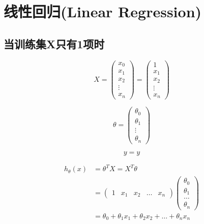 \section{线性回归(Linear Regression)}
\subsection{当训练集X只有1项时}

\begin{equation}
	X = \left(\begin{matrix}
			x_0 \\ x_1 \\ x_2 \\ \vdots \\ x_n
		\end{matrix}\right)
	= \left(\begin{matrix}
			1 \\ x_1 \\ x_2 \\ \vdots \\ x_n
		\end{matrix}\right)
\end{equation}


\begin{equation}
	\theta = \left(\begin{matrix}
			\theta_0 \\ \theta_1 \\ \vdots \\ \theta_n
		\end{matrix}\right)
\end{equation}


\begin{equation}
y = y
\end{equation}


\begin{equation} \begin{aligned}
	h_\theta(x) & = \theta^{T}X = X^T\theta \\
	& = \left( \begin{matrix}
			1 & x_1 & x_2 & \dots & x_n
		\end{matrix}\right)
		\left(\begin{matrix}
			\theta_0 \\
			\theta_1 \\
			\dots \\
			\theta_n
		\end{matrix}\right) \\
	& = \theta_0 + \theta_1x_1 + \theta_2x_2 + \dots + \theta_nx_n
\end{aligned} \end{equation}




